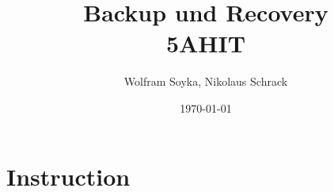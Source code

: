 \documentclass[12p]{article}
\author{Wolfram Soyka, Nikolaus Schrack}
\title{\Huge{Backup und Recovery}\\\Large{5AHIT}}
\date{\today}
\begin{document}
	\maketitle
	
	\newpage
	\tableofcontents
	
	\newpage
	\section{Instruction}
	
	

	
\end{document}
